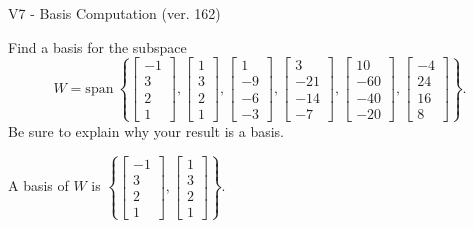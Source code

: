 \begin{exercise}
  \begin{exerciseTitle}V7 - Basis Computation (ver. 162)\end{exerciseTitle}
  \begin{exerciseStatement}
    Find a basis for the subspace 
\[W=\mathrm{span}\ \left\{\left[\begin{array}{r}
-1 \\
3 \\
2 \\
1
\end{array}\right] , \left[\begin{array}{r}
1 \\
3 \\
2 \\
1
\end{array}\right] , \left[\begin{array}{r}
1 \\
-9 \\
-6 \\
-3
\end{array}\right] , \left[\begin{array}{r}
3 \\
-21 \\
-14 \\
-7
\end{array}\right] , \left[\begin{array}{r}
10 \\
-60 \\
-40 \\
-20
\end{array}\right] , \left[\begin{array}{r}
-4 \\
24 \\
16 \\
8
\end{array}\right]\right\}.\]
 Be sure to explain why your result is a basis.


  \end{exerciseStatement}
  \begin{exerciseAnswer}
   A basis of \(W\) is  \(\left\{\left[\begin{array}{r}
-1 \\
3 \\
2 \\
1
\end{array}\right] , \left[\begin{array}{r}
1 \\
3 \\
2 \\
1
\end{array}\right]\right\}\).
  


  \end{exerciseAnswer}
\end{exercise}